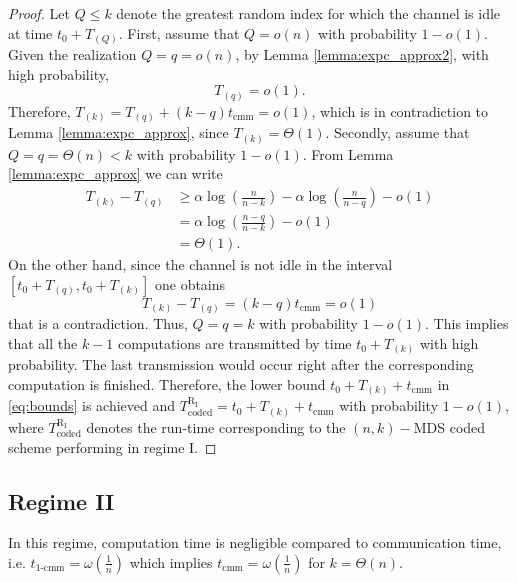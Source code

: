 \documentclass[onecolumn,journal,twoside]{IEEEtran}
\begin{document}
\begin{proof}
\iffalse
Since $k = \Theta (n)$, with probability $1-o(1)$, we can write 
\begin{align}
T_{(k)}-T_{(k-1)} &\geq \alpha \log (\frac{n}{n-k}) - \alpha \log (\frac{n}{n-k+1}) - o(1) \\
&=\alpha \log (\frac{n-k+1}{n-k})  -o(1)\\
&= O(1)\\
&> (k-1)t_{\text{cmm}}.
\end{align}

****
Why (24) implies (25)? It does not look correct.
****
\fi

Let $Q\leq k$ denote the greatest random index for which the channel is idle at time $t_0 + T_{(Q)}$. First, assume that $Q=o (n)$ with probability $1 - o(1)$. Given the realization $Q = q = o(n)$,  by Lemma \ref{lemma:expc_approx2}, with high probability,
\begin{equation}
T_{(q)} = o(1).
\end{equation}
Therefore, $T_{(k)}=T_{(q)}+(k-q)t_{\text{cmm}}=o(1)$, which is in contradiction to Lemma \ref{lemma:expc_approx}, since $T_{(k)}=\Theta(1)$. Secondly, assume that $Q = q = \Theta(n)<k$ with probability $1 - o(1)$. From Lemma \ref{lemma:expc_approx} we can write 
\begin{align}
T_{(k)}-T_{(q)} &\geq \alpha \log (\frac{n}{n-k}) - \alpha \log (\frac{n}{n-q}) - o(1) \nonumber\\
&=\alpha \log (\frac{n-q}{n-k})  -o(1)\nonumber\\
&= \Theta(1).\nonumber
\end{align}
On the other hand, since the channel is not idle in the interval $[t_0+T_{(q)},t_0+T_{(k)}]$ one obtains 
$$
T_{(k)}-T_{(q)} = (k-q)t_{\text{cmm}} = o(1)
$$ 
that is a contradiction. Thus, $Q = q = k$ with probability $1 - o(1)$. This implies that all the $k-1$ computations are transmitted by time  $t_0+T_{(k)}$ with high probability. The last transmission would occur right after the corresponding computation is finished. Therefore, the lower bound $t_0+T_{(k)}+t_{\text{cmm}}$ in \eqref{eq:bounds} is achieved and $T^{\text{R}_{\text{I}}}_{\text{coded}}=t_0+T_{(k)}+t_{\text{cmm}}$ with probability $1-o(1)$, where $T^{\text{R}_{\text{I}}}_{\text{coded}}$ denotes the run-time corresponding to the $(n,k)-$MDS coded scheme performing in regime I. 
\end{proof}


\subsection{Regime II}
In this regime, computation time is negligible compared to communication time, i.e. $t_{\text{1-cmm}}=\omega(\frac{1}{n})$ which implies $t_{\text{cmm}}=\omega(\frac{1}{n})$ for $k=\Theta(n)$.  
\end{document}
